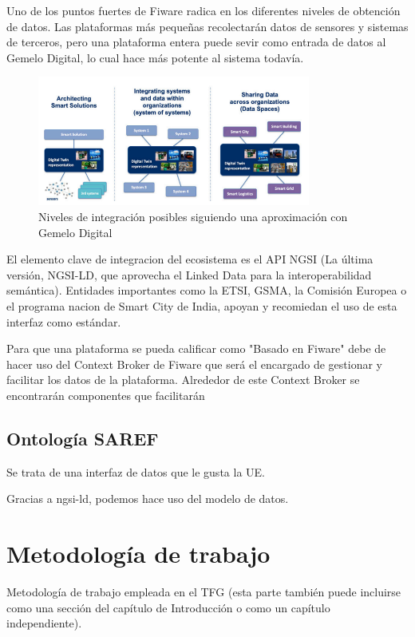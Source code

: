 \documentclass[12pt, a4paper, twoside]{article}
\begin{document}
Uno de los puntos fuertes de Fiware radica en los diferentes niveles de obtención de datos.
Las plataformas más pequeñas recolectarán datos de sensores y sistemas de terceros,
pero una plataforma entera puede sevir como entrada de datos al Gemelo Digital, lo
cual hace más potente al sistema todavía.

\begin{figure}[h]
  \centering
  \includegraphics[width=0.8\textwidth]{digital_twin_levels_integration.png}
  \caption{Niveles de integración posibles siguiendo una aproximación con Gemelo Digital}
\end{figure}

El elemento clave de integracion del ecosistema es el API NGSI 
(La última versión, NGSI-LD, que aprovecha el Linked Data para la 
interoperabilidad semántica). Entidades importantes como
la ETSI, GSMA, la Comisión Europea o el programa nacion de 
Smart City de India, apoyan y recomiedan el uso de esta interfaz como estándar.

Para que una plataforma se pueda calificar como "Basado en Fiware" debe de hacer uso
del Context Broker de Fiware que será el encargado de gestionar y facilitar los datos
de la plataforma. Alrededor de este Context Broker se encontrarán componentes que 
facilitarán 

\subsection{Ontología SAREF}
Se trata de una interfaz de datos que le gusta la UE.

Gracias a ngsi-ld, podemos hace uso del modelo de datos.

\section{Metodología de trabajo}
Metodología de trabajo empleada en el TFG (esta parte también puede incluirse como una sección del capítulo de Introducción o como un capítulo independiente).
\end{document}
